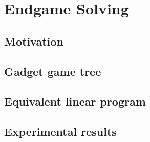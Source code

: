 \chapter{Endgame Solving}

\section{Motivation}

\section{Gadget game tree}

\section{Equivalent linear program}

\section{Experimental results}
